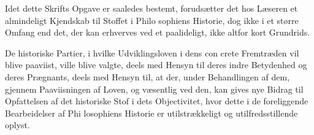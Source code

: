  Idet dette Skrifts Opgave er saaledes bestemt, forudsætter
det hos Læseren et almindeligt Kjendskab til Stoffet i Philo\-%
sophiens Historie, dog ikke i et større Omfang end det, der
kan erhverves ved et paalideligt, ikke altfor kort Grundrids.

De historiske Partier, i hvilke Udviklingsloven i dens con\-%
crete Fremtræden vil blive paaviist, ville blive valgte, deels
med Hensyn til deres indre Betydenhed og deres Prægnants,
deels med Hensyn til, at der, under Behandlingen af dem,
gjennem Paaviisningen af Loven, og væsentlig ved den, kan
gives nye Bidrag til Opfattelsen af det historiske Stof i dets
Objectivitet, hvor dette i de foreliggende Bearbeidelser af Phi\-%
losophiens Historie er utilstrækkeligt og utilfredsstillende oplyst.

\divrule

